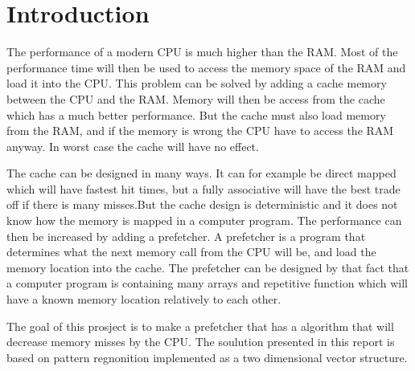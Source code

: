 \section*{Introduction}
The performance of a modern CPU is much higher than the RAM. Most of the performance time will then be used to access the memory space of the RAM and load it into the CPU. This problem can be solved by adding a cache memory between the CPU and the RAM. Memory will then be access from the cache which has a much better performance. But the cache must also load memory from the RAM, and if the memory is wrong the CPU have to access the RAM anyway. In worst case the cache will have no effect.

The cache can be designed in many ways. It can for example be direct mapped which will have fastest hit times, but a fully associative will have the best trade off if there is many misses.But the cache design is deterministic and it does not know how the memory is mapped in a computer program. The performance can then be increased by adding a prefetcher. A prefetcher is a program that determines what the next memory call from the CPU will be, and load the memory location into the cache. The prefetcher can be designed by that fact that a computer program is containing many arrays and repetitive function which will have a known memory location relatively to each other.

The goal of this prosject is to make a prefetcher that has a algorithm that will decrease memory misses by the CPU. The soulution presented in this report is based on pattern regnonition implemented as a two dimensional vector structure.
